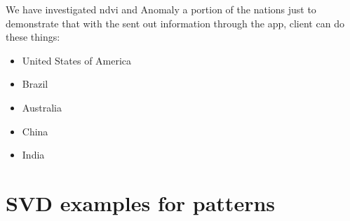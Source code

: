 We have investigated \gls{ndvi} and Anomaly a portion of the nations just to demonstrate that with the sent out information through the app, client can do these things:

\begin{itemize}
    \item United States of America
    
    \item Brazil
    
    \item Australia
    
    \item China
    
    \item India
    
\end{itemize}

   

\section{SVD examples for patterns}


